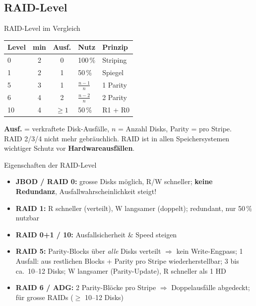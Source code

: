 \documentclass[a4paper, fontsize=7pt]{scrartcl}
\renewcommand*{\arraystretch}{1.5}  %
\begin{document}
\subsection{RAID-Level}

\begin{mainbox}{RAID-Level im Vergleich}
\renewcommand*{\arraystretch}{1.15}
\setlength{\tabcolsep}{3pt}
\begin{center}
\begin{tabular}{l|c|c|l|l}
\textbf{Level} & \textbf{min} & \textbf{Ausf.} & \textbf{Nutz} & \textbf{Prinzip} \\
\hline
0 & 2 & 0 & 100\,\% & Striping \\
1 & 2 & 1 & 50\,\% & Spiegel \\
5 & 3 & 1 & $\frac{n-1}{n}$ & 1 Parity \\
6 & 4 & 2 & $\frac{n-2}{n}$ & 2 Parity \\
10 & 4 & $\ge 1$ & 50\,\% & R1 + R0 \\
\end{tabular}
\end{center}
\textbf{Ausf.} = verkraftete Disk-Ausfälle, $n$ = Anzahl Disks, Parity =
pro Stripe.\\
RAID 2/3/4 nicht mehr gebräuchlich. RAID ist in allen Speichersystemen wichtiger
Schutz vor \textbf{Hardwareausfällen}.
\end{mainbox}

\begin{mainbox}{Eigenschaften der RAID-Level}
\begin{itemize}
    \item \textbf{JBOD / RAID 0:} grosse Disks möglich, R/W schneller;
          \textbf{keine Redundanz}, Ausfallwahrscheinlichkeit steigt!
    \item \textbf{RAID 1:} R schneller (verteilt), W langsamer (doppelt);
          redundant, nur 50\,\% nutzbar
    \item \textbf{RAID 0+1 / 10:} Ausfallsicherheit \& Speed steigen
    \item \textbf{RAID 5:} Parity-Blocks über \emph{alle} Disks verteilt
          $\Rightarrow$ kein Write-Engpass; 1 Ausfall: aus restlichen Blocks +
          Parity pro Stripe wiederherstellbar; 3 bis ca.\ 10--12 Disks;
          W langsamer (Parity-Update), R schneller als 1 HD
    \item \textbf{RAID 6 / ADG:} 2 Parity-Blöcke pro Stripe
          $\Rightarrow$ Doppelausfälle abgedeckt; für grosse RAIDs
          ($\ge$ 10--12 Disks)
\end{itemize}
\end{mainbox}
\end{document}
